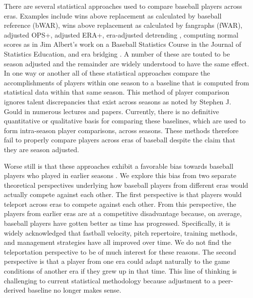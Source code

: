 \documentclass[11pt]{article}\usepackage[]{graphicx}\usepackage[]{color}
\begin{document}
There are several statistical approaches used to compare baseball players 
across eras. 
Examples include 
wins above replacement as calculated by baseball reference (bWAR), %
wins above replacement as calculated by fangraphs (fWAR), %
adjusted OPS+, %
adjusted ERA+, %
era-adjusted detrending \citep{petersen}, 
computing normal scores as in Jim Albert's work on a Baseball Statistics Course 
in the Journal of Statistics Education, 
and era bridging \citep{berry1999eras}. 
A number of these are touted to be season adjusted and the remainder are 
widely understood to have the same effect.  
In one way or another all of these statistical approaches compare the  
accomplishments of players within one season to a baseline that 
is computed from statistical data within that same season.  
This method of player comparison ignores talent discrepancies that exist 
across seasons as noted by Stephen J. Gould in numerous lectures and papers.
Currently, there is no definitive quantitative or qualitative basis for 
comparing these baselines, which are used to form intra-season player 
comparisons, across seasons.  These methods therefore fail to properly 
compare players across eras of baseball despite the claim that they are 
season adjusted.  

Worse still is that these approaches exhibit a favorable bias towards baseball 
players who played in earlier seasons 
\citep{schmidt2005concentration}.  
We explore this bias from two separate theoretical perspectives underlying how 
baseball players from different eras would actually compete against each 
other.  The first perspective is that players would teleport across eras to 
compete against each other.  From this perspective, the players from earlier eras 
are at a competitive disadvantage because, on average, baseball players have 
gotten better as time has progressed.
Specifically, it is widely acknowledged that 
fastball velocity, pitch repertoire, training methods, and management 
strategies have all improved over time.  
We do not find the teleportation perspective to be of 
much interest for these reasons.  The second perspective is that a player from 
one era could adapt naturally to the game conditions of another era if they 
grew up in that time. 
This line of thinking is challenging to current statistical methodology because 
adjustment to a peer-derived baseline no longer makes sense. 
\end{document}
